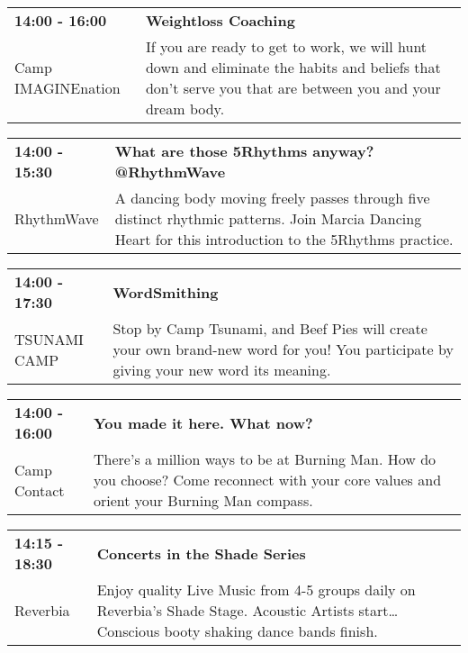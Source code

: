 \begin{tabular}{ p{1in} p{2.2in} }
    \textbf{14:00 - 16:00} & \textbf{Weightloss Coaching} \\
    Camp IMAGINEnation \newline  & If you are ready to get to work, we will hunt down and eliminate the habits and beliefs that don't serve you that are between you and your dream body. \\
    \hline 
\end{tabular}
    
\begin{tabular}{ p{1in} p{2.2in} }
    \textbf{14:00 - 15:30} & \textbf{What are those 5Rhythms anyway? @RhythmWave} \\
    RhythmWave \newline  & A dancing body moving freely passes through five distinct rhythmic patterns. Join Marcia Dancing Heart for this introduction to the 5Rhythms practice. \\
    \hline 
\end{tabular}
    
\begin{tabular}{ p{1in} p{2.2in} }
    \textbf{14:00 - 17:30} & \textbf{WordSmithing} \\
    TSUNAMI CAMP \newline  & Stop by Camp Tsunami, and Beef Pies will create your own brand-new word for you! You participate by giving your new word its meaning. \\
    \hline 
\end{tabular}
    
\begin{tabular}{ p{1in} p{2.2in} }
    \textbf{14:00 - 16:00} & \textbf{You made it here. What now?} \\
    Camp Contact \newline  & There's a million ways to be at Burning Man. How do you choose? Come reconnect with your core values and orient your Burning Man compass. \\
    \hline 
\end{tabular}
    
\begin{tabular}{ p{1in} p{2.2in} }
    \textbf{14:15 - 18:30} & \textbf{Concerts in the Shade Series} \\
    Reverbia \newline  & Enjoy quality Live Music from 4-5 groups daily on Reverbia's Shade Stage.  Acoustic Artists start\ldots Conscious booty shaking dance bands finish. \\
    \hline 
\end{tabular}
    
